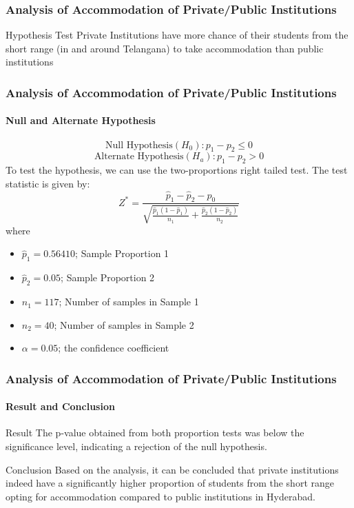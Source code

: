 \documentclass{beamer}
\begin{document}
\begin{frame}
\frametitle{Analysis of Accommodation of Private/Public Institutions}
\begin{block}{Hypothesis Test}
Private Institutions have more chance of their students from the short range (in and around Telangana) to take accommodation than public institutions
\end{block}
\end{frame}

\begin{frame}
\frametitle{Analysis of Accommodation of Private/Public Institutions}
\framesubtitle{Null and Alternate Hypothesis}
$$\text{Null Hypothesis}(H_0): p_1 - p_2 \le 0 $$
$$\text{Alternate Hypothesis}(H_a): p_1 - p_2  > 0$$  
To test the hypothesis, we can use the two-proportions right tailed test. The test statistic is given by:
\[
Z^* = \frac{{\hat{p}_1 - \hat{p}_2 - p_0}}{{\sqrt{\frac{{\hat{p}_1(1-\hat{p}_1)}}{{n_1}} + \frac{{\hat{p}_2(1-\hat{p}_2)}}{{n_2}}}}}
\]
where
\begin{itemize}
    \item $\hat{p}_1 = 0.56410$; Sample Proportion 1
    \item $\hat{p}_2 = 0.05$; Sample Proportion 2
    \item $n_1 = 117$; Number of samples in Sample 1 
    \item $n_2 = 40$; Number of samples in Sample 2
    \item $\alpha = 0.05$; the confidence coefficient
\end{itemize}
\end{frame}

\begin{frame}
\frametitle{Analysis of Accommodation of Private/Public Institutions}
\framesubtitle{Result and Conclusion}
\begin{block}{Result}
The p-value obtained from both proportion tests was below the significance level, indicating a rejection of the null hypothesis.
\end{block}

\begin{block}{Conclusion}
Based on the analysis, it can be concluded that private institutions indeed have a
significantly higher proportion of students from the short range opting for accommodation compared to public institutions in Hyderabad.
\end{block}
\end{frame}
\end{document}
